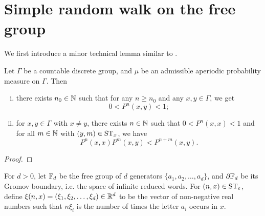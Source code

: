 \documentclass[12pt, class = article, crop = false, a4paper, twoside]{standalone}
\begin{document}
\section{Simple random walk on the free group}
\label{sec:free}

We first introduce a minor technical lemma similar to \cite[Lemma 3.10]{DOMA17}.
\begin{proposition}
\label{prop:probability:inequalities}

    Let $\Gamma$ be a countable discrete group, and $\mu$ be an admissible aperiodic probability measure on $\Gamma$. Then
    \begin{enumerate}[(i)]
        \item there exists $n_{0}\in\mathbb{N}$ such that for any $n\geq n_{0}$ and any $x, y\in\Gamma$, we get 
        \begin{equation*}
            0 < P^{n}(x, y) < 1;
        \end{equation*}
        \item for $x, y\in\Gamma$ with $x\neq y$, there exists $n\in\mathbb{N}$ such that $0 < P^{n}(x, x) < 1$ and for all $m\in\mathbb{N}$ with $(y, m)\in\operatorname{ST}_{x}$, we have 
        \begin{equation*}
            P^{n}(x, x)P^{m}(x, y) < P^{n + m}(x, y).
        \end{equation*}
    \end{enumerate}
\end{proposition}

\begin{proof}

    
\end{proof}

\begin{notation}

    For $d > 0$, let $\mathbb{F}_{d}$ be the free group of $d$ generators $\{a_{1}, a_{2}, \dots, a_{d}\}$, and $\partial \mathbb{F}_{d}$ be its Gromov boundary, i.e. the space of infinite reduced words. For $(n, x)\in\operatorname{ST}_{e}$, define $\xi(n, x) = (\xi_{1}, \xi_{2}, \dots, \xi_{d})\in\mathbb{R}^{d}$ to be the vector of non-negative real numbers such that $n\xi_{i}$ is the number of times the letter $a_{i}$ occurs in $x$.
\end{notation}
\end{document}
